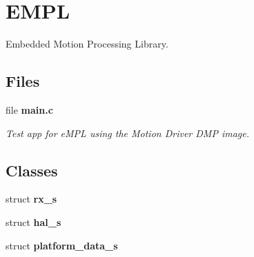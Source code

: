 \section{E\+M\+PL}
\label{group__eMPL}


Embedded Motion Processing Library.  


\subsection*{Files}
\begin{DoxyCompactItemize}
\item 
file \textbf{ main.\+c}
\begin{DoxyCompactList}\small\item\em Test app for e\+M\+PL using the Motion Driver D\+MP image. \end{DoxyCompactList}\end{DoxyCompactItemize}
\subsection*{Classes}
\begin{DoxyCompactItemize}
\item 
struct \textbf{ rx\+\_\+s}
\item 
struct \textbf{ hal\+\_\+s}
\item 
struct \textbf{ platform\+\_\+data\+\_\+s}
\end{DoxyCompactItemize}
